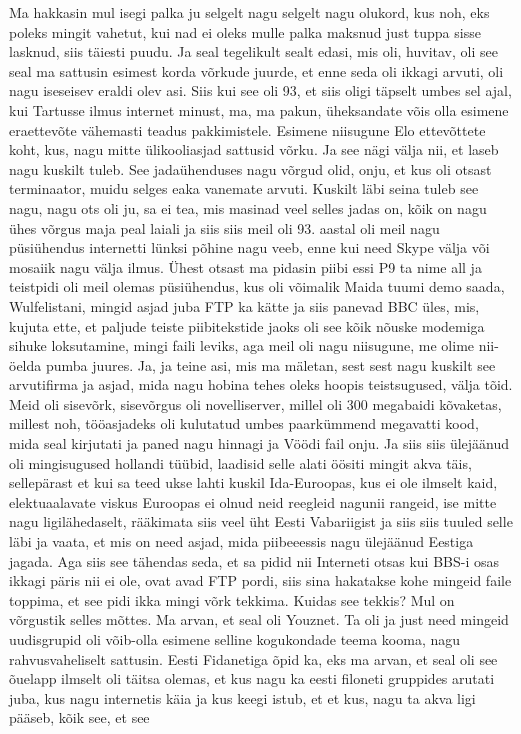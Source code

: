 Ma hakkasin mul isegi palka ju selgelt nagu selgelt nagu olukord, kus noh, eks poleks mingit vahetut, kui nad ei oleks mulle palka maksnud just tuppa sisse lasknud, siis täiesti puudu. Ja seal tegelikult sealt edasi, mis oli, huvitav, oli see seal ma sattusin esimest korda võrkude juurde, et enne seda oli ikkagi arvuti, oli nagu iseseisev eraldi olev asi. Siis kui see oli 93, et siis oligi täpselt umbes sel ajal, kui Tartusse ilmus internet minust, ma, ma pakun, üheksandate võis olla esimene eraettevõte vähemasti teadus pakkimistele. Esimene niisugune Elo ettevõttete koht, kus, nagu mitte ülikooliasjad sattusid võrku. Ja see nägi välja nii, et laseb nagu kuskilt tuleb.
See jadaühenduses nagu võrgud olid, onju, et kus oli otsast terminaator, muidu selges eaka vanemate arvuti. Kuskilt läbi seina tuleb see nagu, nagu ots oli ju, sa ei tea, mis masinad veel selles jadas on, kõik on nagu ühes võrgus maja peal laiali ja siis siis meil oli 93. aastal oli meil nagu püsiühendus internetti lünksi põhine nagu veeb, enne kui need Skype välja või mosaiik nagu välja ilmus. Ühest otsast ma pidasin piibi essi P9 ta nime all ja teistpidi oli meil olemas püsiühendus, kus oli võimalik Maida tuumi demo saada, Wulfelistani, mingid asjad juba FTP ka kätte ja siis panevad BBC üles, mis, kujuta ette, et paljude teiste piibitekstide jaoks oli see kõik nõuske modemiga sihuke loksutamine, mingi faili leviks, aga meil oli nagu niisugune, me olime nii-öelda pumba juures. Ja, ja teine asi, mis ma mäletan, sest sest nagu kuskilt see arvutifirma ja asjad, mida nagu hobina tehes oleks hoopis teistsugused, välja tõid. Meid oli sisevõrk, sisevõrgus oli novelliserver, millel oli 300 megabaidi kõvaketas, millest noh, tööasjadeks oli kulutatud umbes paarkümmend megavatti kood, mida seal kirjutati ja paned nagu hinnagi ja Vöödi fail onju. Ja siis siis ülejäänud oli mingisugused hollandi tüübid, laadisid selle alati öösiti mingit akva täis, sellepärast et kui sa teed ukse lahti kuskil Ida-Euroopas, kus ei ole ilmselt kaid, elektuaalavate viskus Euroopas ei olnud neid reegleid nagunii rangeid, ise mitte nagu ligilähedaselt, rääkimata siis veel üht Eesti Vabariigist ja siis siis tuuled selle läbi ja vaata, et mis on need asjad, mida piibeeessis nagu ülejäänud Eestiga jagada. Aga siis see tähendas seda, et sa pidid nii Interneti otsas kui BBS-i osas ikkagi päris nii ei ole, ovat avad FTP pordi, siis sina hakatakse kohe mingeid faile toppima, et see pidi ikka mingi võrk tekkima. Kuidas see tekkis? Mul on võrgustik selles mõttes.
Ma arvan, et seal oli Youznet. Ta oli ja just need mingeid uudisgrupid oli võib-olla esimene selline kogukondade teema kooma, nagu rahvusvaheliselt sattusin. Eesti Fidanetiga õpid ka, eks ma arvan, et seal oli see õuelapp ilmselt oli täitsa olemas, et kus nagu ka eesti filoneti gruppides arutati juba, kus nagu internetis käia ja kus keegi istub, et et kus, nagu ta akva ligi pääseb, kõik see, et see
